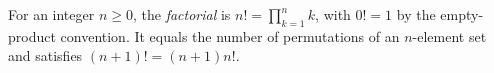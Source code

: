 
For an integer $n\ge0$, the \emph{factorial} is $n!=\prod_{k=1}^n k$, with $0!=1$ by the empty-product convention. It equals the number of permutations of an $n$-element set and satisfies $(n+1)!=(n+1)n!$.
